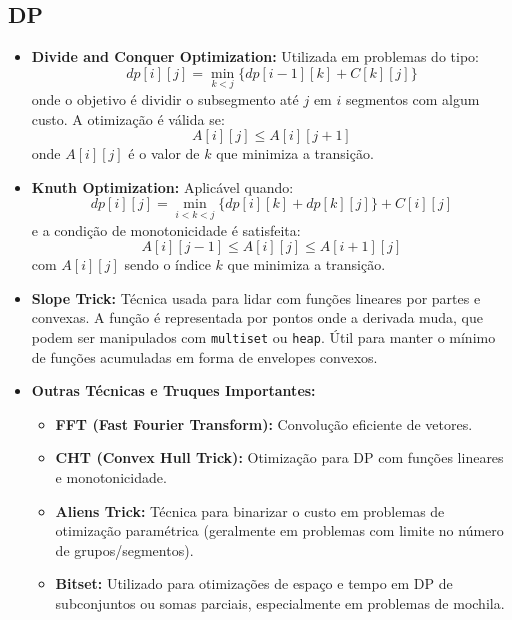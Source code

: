 \subsection{DP}

\begin{small}
\begin{itemize}
    \item \textbf{Divide and Conquer Optimization:} Utilizada em problemas do tipo:
    \[
    dp[i][j] = \min_{k < j} \{ dp[i - 1][k] + C[k][j] \}
    \]
    onde o objetivo é dividir o subsegmento até $j$ em $i$ segmentos com algum custo. A otimização é válida se:
    \[
    A[i][j] \leq A[i][j+1]
    \]
    onde $A[i][j]$ é o valor de $k$ que minimiza a transição.

    \item \textbf{Knuth Optimization:} Aplicável quando:
    \[
    dp[i][j] = \min_{i < k < j} \{ dp[i][k] + dp[k][j] \} + C[i][j]
    \]
    e a condição de monotonicidade é satisfeita:
    \[
    A[i][j-1] \leq A[i][j] \leq A[i+1][j]
    \]
    com $A[i][j]$ sendo o índice $k$ que minimiza a transição.

    \item \textbf{Slope Trick:} Técnica usada para lidar com funções lineares por partes e convexas. A função é representada por pontos onde a derivada muda, que podem ser manipulados com \texttt{multiset} ou \texttt{heap}. Útil para manter o mínimo de funções acumuladas em forma de envelopes convexos.

    \item \textbf{Outras Técnicas e Truques Importantes:}
    \begin{itemize}
        \item \textbf{FFT (Fast Fourier Transform):} Convolução eficiente de vetores.
        \item \textbf{CHT (Convex Hull Trick):} Otimização para DP com funções lineares e monotonicidade.
        \item \textbf{Aliens Trick:} Técnica para binarizar o custo em problemas de otimização paramétrica (geralmente em problemas com limite no número de grupos/segmentos).
        \item \textbf{Bitset:} Utilizado para otimizações de espaço e tempo em DP de subconjuntos ou somas parciais, especialmente em problemas de mochila.
    \end{itemize}
\end{itemize}
\end{small}

